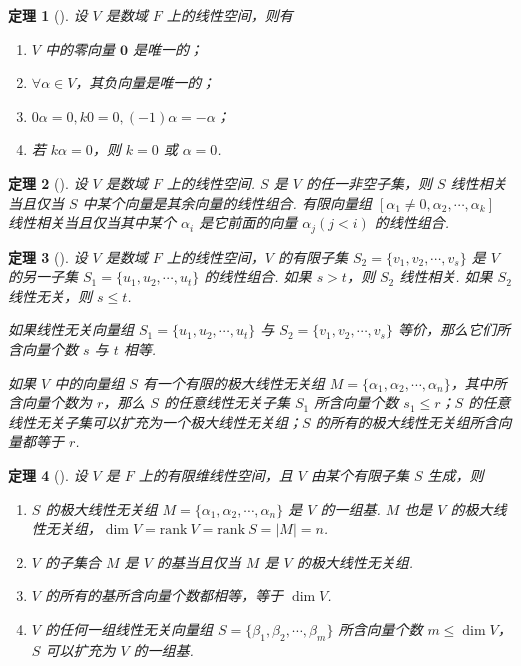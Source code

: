 \documentclass[zihao=-4,UTF8,linespread=1.8,nothm]{aytony_base}
\newtheorem{theorem}{\indent 定理}[subsection]
\begin{document}
\begin{theorem}[]
    设 $V$ 是数域 $F$ 上的线性空间，则有
    \begin{enumerate}[nosep]
        \item $V$ 中的零向量 $\mathbf{0}$ 是唯一的；
        \item $\forall \alpha \in V$，其负向量是唯一的；
        \item $0\alpha=0, k0=0, (-1)\alpha = -\alpha$；
        \item 若 $k\alpha = 0$，则 $k=0$ 或 $\alpha = 0$.
    \end{enumerate}
\end{theorem}

\begin{theorem}[]
    设 $V$ 是数域 $F$ 上的线性空间. $S$ 是 $V$ 的任一非空子集，则 $S$ 线性相关当且仅当 $S$ 中某个向量是其余向量的线性组合. 有限向量组 $[\alpha_1 \neq 0, \alpha_2, \cdots, \alpha_k]$ 线性相关当且仅当其中某个 $\alpha_i$ 是它前面的向量 $\alpha_j(j < i)$ 的线性组合.
\end{theorem}

\begin{theorem}[]
    设 $V$ 是数域 $F$ 上的线性空间，$V$ 的有限子集 $S_2 = \{v_1, v_2, \cdots, v_s\}$ 是 $V$ 的另一子集 $S_1 = \{u_1, u_2, \cdots, u_t\}$ 的线性组合. 如果 $s > t$，则 $S_2$ 线性相关. 如果 $S_2$ 线性无关，则 $s \leqslant t$.

    如果线性无关向量组 $S_1 = \{u_1, u_2, \cdots, u_t\}$ 与 $S_2 = \{v_1, v_2, \cdots, v_s\}$ 等价，那么它们所含向量个数 $s$ 与 $t$ 相等.

    如果 $V$ 中的向量组 $S$ 有一个有限的极大线性无关组 $M = \{\alpha_1, \alpha_2, \cdots, \alpha_n\}$，其中所含向量个数为 $r$，那么 $S$ 的任意线性无关子集 $S_1$ 所含向量个数 $s_1 \leqslant r$；$S$ 的任意线性无关子集可以扩充为一个极大线性无关组；$S$ 的所有的极大线性无关组所含向量都等于 $r$.
\end{theorem}

\begin{theorem}[]
    设 $V$ 是 $F$ 上的有限维线性空间，且 $V$ 由某个有限子集 $S$ 生成，则
    \begin{enumerate}[nosep]
        \item $S$ 的极大线性无关组 $M = \{\alpha_1, \alpha_2, \cdots, \alpha_n\}$ 是 $V$ 的一组基. $M$ 也是 $V$ 的极大线性无关组，$\dim V = \mathrm{rank}\ V = \mathrm{rank}\ S = |M| = n$.
        \item $V$ 的子集合 $M$ 是 $V$ 的基当且仅当 $M$ 是 $V$ 的极大线性无关组.
        \item $V$ 的所有的基所含向量个数都相等，等于 $\dim V$.
        \item $V$ 的任何一组线性无关向量组 $S = \{\beta_1, \beta_2, \cdots, \beta_m\}$ 所含向量个数 $m \leqslant \dim V$，$S$ 可以扩充为 $V$ 的一组基.
    \end{enumerate}
\end{theorem}
\end{document}
